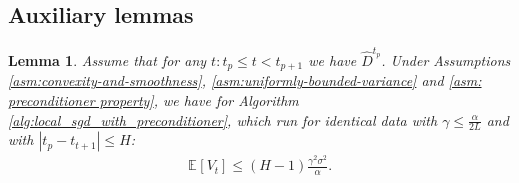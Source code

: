 \documentclass[sn-mathphys,Numbered]{sn-jnl}%
\newtheorem{lemma}{Lemma}%
\renewcommand{\|}{\parallel}
\newcommand\ec[2][]{\ensuremath{\mathbb{E}_{#1} \left[#2\right]}}
\newcommand\br[1]{\left ( #1 \right )}
\newcommand{\abs}[1]{\left\lvert#1\right\rvert}
\renewcommand {\*} {\ast}
\begin{document}
\subsection{Auxiliary lemmas}
\begin{lemma}
    \label{lemma:variance-bound}
    Assume that for any $t: t_p \leq t < t_{p + 1}$ we have $\hat{D}^{t_p}$.
    Under Assumptions \ref{asm:convexity-and-smoothness}, \ref{asm:uniformly-bounded-variance} and \ref{asm: preconditioner property}, we have for 
    Algorithm \ref{alg:local_sgd_with_preconditioner}, which run for identical data with
    $\gamma \leq \frac{\alpha}{2L}$ and with $\abs{t_p - t_{t+1}} \leq H$:
    \begin{align*}
        \ec{V_{t}} \leq \br{H - 1} \frac{\gamma^2 \sigma^2}{\alpha}.
    \end{align*}
\end{lemma}
\end{document}
